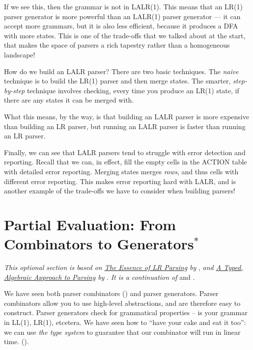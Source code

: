 If we see this, then the grammar is not in LALR(1). This means that an LR(1) parser generator is more powerful than an LALR(1) parser generator --- it can accept more grammars, but it is also less efficient, because it produces a DFA with more states. This is one of the trade-offs that we talked about at the start, that makes the space of parsers a rich tapestry rather than a homogeneous landscape!

How do we build an LALR parser? There are two basic techniques. The \textit{naive} technique is to build the LR(1) parser and then merge states. The smarter, \textit{step-by-step} technique involves checking, every time you produce an LR(1) state, if there are any states it can be merged with. 

What this means, by the way, is that building an LALR parser is more expensive than building an LR parser, but running an LALR parser is faster than running an LR parser.

Finally, we can see that LALR parsers tend to struggle with error detection and reporting. Recall that we can, in effect, fill the empty cells in the ACTION table with detailed error reporting. Merging states merges \textit{rows}, and thus cells with different error reporting. This makes error reporting hard with LALR, and is another example of the trade-offs we have to consider when building parsers!

\section{Partial Evaluation: From Combinators to Generators$^*$}\label{section:partial-evaluation}
\textit{This optional section is based on \href{https://dl.acm.org/doi/pdf/10.1145/215465.215579}{The Essence of LR Parsing} by} \citet{sperber-1995}, \textit{and \href{https://www.cl.cam.ac.uk/~jdy22/papers/a-typed-algebraic-approach-to-parsing.pdf}{A Typed, Algebraic Approach to Parsing} by} \citet{krishnaswami-2019}. \textit{It is a continuation of}  and .

We have seen both parser combinators () and parser generators. Parser combinators allow you to use high-level abstractions, and are therefore easy to construct. Parser generators check for grammatical properties -- is your grammar in LL(1), LR(1), etcetera. We have seen how to ``have your cake and eat it too'': we can use \textit{the type system} to guarantee that our combinator will run in linear time. (). 

